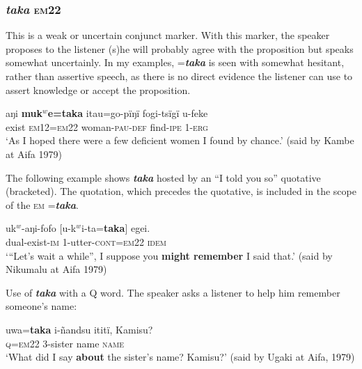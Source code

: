 \documentclass[output=paper]{langsci/langscibook}
\begin{document}
\subsubsection{\textit{taka} \textsc{em}22} 
This is a weak or uncertain conjunct marker. With this marker,  the speaker proposes to the listener (s)he will probably agree with the proposition but speaks somewhat uncertainly.  In my examples, =\textbf{\textit{taka}} is seen with somewhat hesitant, rather than assertive speech, as there is no direct evidence the listener can use to assert knowledge or accept the proposition.

\begin{exe}
	\ex \label{ex:eb52}
	\gll aŋi \textbf{muk$^w$e=taka} itau=go-pïŋï fogi-tsïgï u-feke\\
	exist \textsc{em12=em22} woman-\textsc{pau-def} find-\textsc{ipe} 1-\textsc{erg}\\
	\trans ‘As I hoped there were a few deficient women I found by chance.’ (said by Kambe at Aifa 1979)
\end{exe}

The following example shows \textbf{\textit{taka}} hosted by an “I told you so” quotative (bracketed). The quotation, which precedes the quotative, is included in the scope of the \textsc{em} =\textbf{\textit{taka}}.

\begin{exe}
	\ex \label{ex:eb53}
	\gll uk$^w$-aŋi-fofo [u-k$^w$i-ta=\textbf{taka}] egei.\\
	dual-exist-\textsc{im} 1-utter-\textsc{cont=em22} \textsc{idem}\\
	\trans ‘“Let's wait a while”,  I suppose you \textbf{might remember} I said that.’ (said by Nikumalu at Aifa 1979)
\end{exe}

Use of \textbf{\textit{taka}} with a Q word. The speaker asks a listener to help him remember someone’s name:

\begin{exe}
	\ex \label{ex:eb54}
	\gll uwa=\textbf{taka} i-ñandsu ititï, Kamisu?\\
	\textsc{q}=\textsc{em22} 3-sister name \textsc{name}\\
	\trans ‘What did I say \textbf{about} the sister’s name?  Kamisu?’ (said by Ugaki at Aifa, 1979)
\end{exe}
\end{document}
